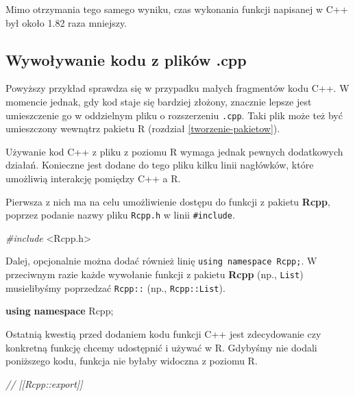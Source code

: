 \documentclass[paper=6in:9in,pagesize=pdftex,headinclude=on,footinclude=on,10pt]{scrbook}
\newenvironment{Shaded}{\begin{snugshade}}{\end{snugshade}}
\newcommand{\CommentTok}[1]{\textcolor[rgb]{0.56,0.35,0.01}{\textit{#1}}}
\newcommand{\ImportTok}[1]{#1}
\newcommand{\KeywordTok}[1]{\textcolor[rgb]{0.13,0.29,0.53}{\textbf{#1}}}
\newcommand{\NormalTok}[1]{#1}
\newcommand{\PreprocessorTok}[1]{\textcolor[rgb]{0.56,0.35,0.01}{\textit{#1}}}
\begin{document}
Mimo otrzymania tego samego wyniku, czas wykonania funkcji napisanej w C++ był około 1.82 raza mniejszy.

\hypertarget{sourceCpp}{%
\subsection{Wywoływanie kodu z plików .cpp}\label{sourceCpp}}

Powyższy przykład sprawdza się w przypadku małych fragmentów kodu C++.
W momencie jednak, gdy kod staje się bardziej złożony, znacznie lepsze jest umieszczenie go w oddzielnym pliku o rozszerzeniu \texttt{.cpp}.
Taki plik może też być umieszczony wewnątrz pakietu R (rozdział \ref{tworzenie-pakietow}).

Używanie kod C++ z pliku z poziomu R wymaga jednak pewnych dodatkowych działań.
Konieczne jest dodane do tego pliku kilku linii nagłówków, które umożliwią interakcję pomiędzy C++ a R.

Pierwsza z nich ma na celu umożliwienie dostępu do funkcji z pakietu \textbf{Rcpp}, poprzez podanie nazwy pliku \texttt{Rcpp.h} w linii \texttt{\#include}.

\begin{Shaded}
\begin{Highlighting}[]
\PreprocessorTok{#include }\ImportTok{<Rcpp.h>}
\end{Highlighting}
\end{Shaded}

Dalej, opcjonalnie można dodać również linię \texttt{using\ namespace\ Rcpp;}.
W przeciwnym razie każde wywołanie funkcji z pakietu \textbf{Rcpp} (np., \texttt{List}) musielibyśmy poprzedzać \texttt{Rcpp::} (np., \texttt{Rcpp::List}).

\begin{Shaded}
\begin{Highlighting}[]
\KeywordTok{using} \KeywordTok{namespace}\NormalTok{ Rcpp;}
\end{Highlighting}
\end{Shaded}

Ostatnią kwestią przed dodaniem kodu funkcji C++ jest zdecydowanie czy konkretną funkcję chcemy udostępnić i używać w R.
Gdybyśmy nie dodali poniższego kodu, funkcja nie byłaby widoczna z poziomu R.

\begin{Shaded}
\begin{Highlighting}[]
\CommentTok{// [[Rcpp::export]]}
\end{Highlighting}
\end{Shaded}
\end{document}
